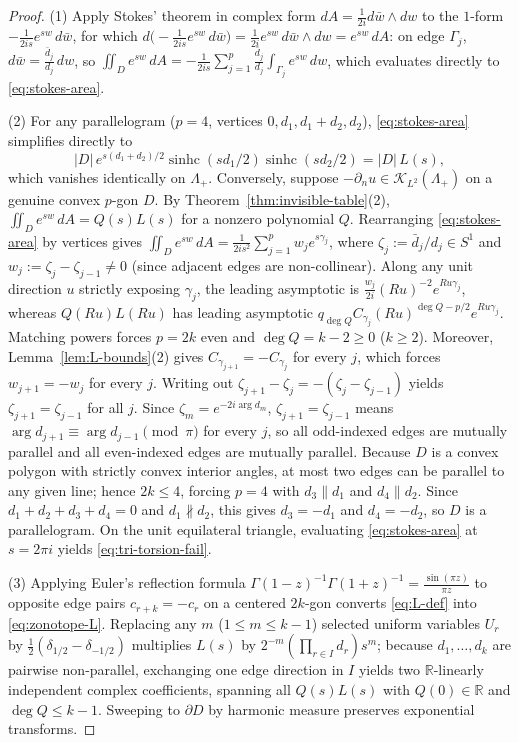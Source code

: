 \documentclass[11pt,reqno]{amsart}
\theoremstyle{definition}
\theoremstyle{remark}
\newcommand{\R}{\mathbb{R}}
\DeclareMathOperator{\sinhc}{sinhc}
\begin{document}
\begin{proof}
(1) Apply Stokes' theorem in complex form $dA = \frac{1}{2i} d\bar w \wedge dw$ to the $1$-form $-\frac{1}{2is} e^{sw}\,d\bar w$, for which $d\bigl(-\frac{1}{2is}e^{sw}\,d\bar w\bigr) = \frac{1}{2i}e^{sw}\,d\bar w \wedge dw = e^{sw}\,dA$: on edge $\Gamma_j$, $d\bar w = \frac{\bar d_j}{d_j}\,dw$, so $\iint_D e^{sw}\,dA = -\frac{1}{2is}\sum_{j=1}^p \frac{\bar d_j}{d_j}\int_{\Gamma_j} e^{sw}\,dw$, which evaluates directly to \eqref{eq:stokes-area}.

(2) For any parallelogram ($p = 4$, vertices $0, d_1, d_1+d_2, d_2$), \eqref{eq:stokes-area} simplifies directly to
\[
  |D|\,e^{s(d_1+d_2)/2}\sinhc(s d_1/2)\sinhc(s d_2/2) = |D|\,L(s),
\]
which vanishes identically on $\Lambda_+$. Conversely, suppose $-\partial_n u \in \mathcal{K}_{L^2}(\Lambda_+)$ on a genuine convex $p$-gon $D$. By Theorem~\ref{thm:invisible-table}(2), $\iint_D e^{sw}\,dA = Q(s) L(s)$ for a nonzero polynomial $Q$. Rearranging \eqref{eq:stokes-area} by vertices gives $\iint_D e^{sw}\,dA = \frac{1}{2is^2}\sum_{j=1}^p w_j e^{s\gamma_j}$, where $\zeta_j := \bar d_j / d_j \in S^1$ and $w_j := \zeta_j - \zeta_{j-1} \ne 0$ (since adjacent edges are non-collinear). Along any unit direction $u$ strictly exposing $\gamma_j$, the leading asymptotic is $\frac{w_j}{2i}(R u)^{-2} e^{R u \gamma_j}$, whereas $Q(R u)L(R u)$ has leading asymptotic $q_{\deg Q} C_{\gamma_j} (R u)^{\deg Q - p/2} e^{R u \gamma_j}$. Matching powers forces $p = 2k$ even and $\deg Q = k - 2 \ge 0$ ($k \ge 2$). Moreover, Lemma~\ref{lem:L-bounds}(2) gives $C_{\gamma_{j+1}} = -C_{\gamma_j}$ for every $j$, which forces $w_{j+1} = -w_j$ for every $j$. Writing out $\zeta_{j+1} - \zeta_j = -(\zeta_j - \zeta_{j-1})$ yields $\zeta_{j+1} = \zeta_{j-1}$ for all $j$. Since $\zeta_m = e^{-2i\arg d_m}$, $\zeta_{j+1} = \zeta_{j-1}$ means $\arg d_{j+1} \equiv \arg d_{j-1} \pmod\pi$ for every $j$, so all odd-indexed edges are mutually parallel and all even-indexed edges are mutually parallel. Because $D$ is a convex polygon with strictly convex interior angles, at most two edges can be parallel to any given line; hence $2k \le 4$, forcing $p = 4$ with $d_3 \parallel d_1$ and $d_4 \parallel d_2$. Since $d_1 + d_2 + d_3 + d_4 = 0$ and $d_1 \nparallel d_2$, this gives $d_3 = -d_1$ and $d_4 = -d_2$, so $D$ is a parallelogram. On the unit equilateral triangle, evaluating \eqref{eq:stokes-area} at $s = 2\pi i$ yields \eqref{eq:tri-torsion-fail}.

(3) Applying Euler's reflection formula $\Gamma(1-z)^{-1}\Gamma(1+z)^{-1} = \frac{\sin(\pi z)}{\pi z}$ to opposite edge pairs $c_{r+k} = -c_r$ on a centered $2k$-gon converts \eqref{eq:L-def} into \eqref{eq:zonotope-L}. Replacing any $m$ ($1 \le m \le k-1$) selected uniform variables $U_r$ by $\frac12(\delta_{1/2} - \delta_{-1/2})$ multiplies $L(s)$ by $2^{-m}(\prod_{r\in I} d_r) s^m$; because $d_1,\dots,d_k$ are pairwise non-parallel, exchanging one edge direction in $I$ yields two $\R$-linearly independent complex coefficients, spanning all $Q(s)L(s)$ with $Q(0)\in\R$ and $\deg Q \le k-1$. Sweeping to $\partial D$ by harmonic measure preserves exponential transforms.
\end{proof}
\end{document}

